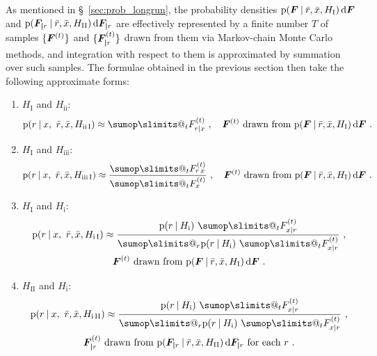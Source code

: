 \documentclass[\ifafour a4paper,12pt,\else a5paper,10pt,\fi%
onecolumn,oneside,article,%
british%
]{memoir}
\makeatletter
\theoremstyle{remark}
\theoremstyle{innote}
\def\sum{\DOTSI\sumop\slimits@}
\newcommand*{\di}{\mathrm{d}}%
\DeclarePairedDelimiter\set{\{}{\}}
\newcommand*{\p}{\mathrm{p}}%
\renewcommand*{\|}[1][]{\nonscript\:#1\vert\nonscript\:\mathopen{}}
\renewcommand*{\=}{\TextOrMath\texteq\eq}
\newcommand*{\sect}{\S}%
\newcommand*{\q}{}%
\DeclareRobustCommand*{\q}{%
  \mathord{\mathpalette\bigcdot@{}}%
}
\newcommand*{\bigcdot@scalefactor}{0.7}
\newcommand*{\bigcdot@widthfactor}{1.5}
\newcommand*{\bigcdot@}[2]{%
  \sbox0{$#1\vcenter{}$}%
  \sbox2{$#1\cdot\m@th$}%
  \hbox to \bigcdot@widthfactor\wd2{%
    \hfil
    \raise\ht0\hbox{%
      \scalebox{\bigcdot@scalefactor}{%
        \lower\ht0\hbox{$#1\bullet\m@th$}%
      }%
    }%
    \hfil
  }%
}
\newcommand*{\ro}{r}
\newcommand*{\xo}{x}
\newcommand*{\rd}{\bar{r}}
\newcommand*{\xd}{\bar{x}}
\newcommand*{\yF}{\bm{F}}
\newcommand*{\yFr}{\yF_{\bm{\mid}r}}
\makeatother
\begin{document}
As mentioned in \sect~\ref{sec:prob_longrun}, the probability densities
$\p(\yF\|\rd,\xd, H_{\textrm{I}})\,\di\yF$ and
$\p(\yFr\|\rd,\xd, H_{\textrm{II}})\,\di\yFr$ are effectively represented
by a finite number $T$ of samples $\set{\yF^{(t)}}$ and $\set{\yFr^{(t)}}$
drawn from them via Markov-chain Monte Carlo methods, and integration with
respect to them is approximated by summation over such samples. The
formulae obtained in the previous section then take the following
approximate forms:
\begin{enumerate}[wide,label=\arabic*'.]
\item\label{item:approx_I_ii} $H_{\textrm{I}}$ and $H_{\textrm{ii}}$:
  \begin{equation}
    \label{eq:approx_post_rx_simple}
    \p(\ro \| \xo,\ \rd,\xd, H_{\textrm{ii\,I}}) 
    \approx  \sum_{t} F^{(t)}_{\ro\mid\xo} \ ,\quad
    \yF^{(t)}\text{ drawn from }\p(\yF\|\rd,\xd, H_{\textrm{I}})\,\di\yF \ .
\end{equation}
  
\item\label{item:approx_I_iii} $H_{\textrm{I}}$ and $H_{\textrm{iii}}$:
  \begin{equation}
    \label{eq:approx_post_rx_updated}
        \p(\ro \| \xo,\ \rd,\xd, H_{\textrm{iii\,I}}) \approx
        \frac{\sum_{t} F^{(t)}_{\ro\,\xo}}{
          \sum_{t} F^{(t)}_{\q\xo} } \ ,\quad
    \yF^{(t)}\text{ drawn from }\p(\yF\|\rd,\xd, H_{\textrm{I}})\,\di\yF \ .
  \end{equation}

\item\label{item:approx_I_i} $H_{\textrm{I}}$ and $H_{\textrm{i}}$:
  \begin{multline}
    \label{eq:approx_post_xr_unfactorized}
    \p(\ro \| \xo,\ \rd,\xd, H_{\textrm{i\,I}}) \approx \frac{
    \p(\ro\|  H_{\textrm{i}})\ \sum_{t} F^{(t)}_{\xo\mid\ro}
  }{ \sum_{r}\p(r\|  H_{\textrm{i}})\ \sum_{t} F^{(t)}_{\xo\mid r} } \ ,\\
    \yF^{(t)}\text{ drawn from }\p(\yF\|\rd,\xd, H_{\textrm{I}})\,\di\yF \ .
\end{multline}
  
\item\label{item:approx_II_i} $H_{\textrm{II}}$ and $H_{\textrm{i}}$:
  \begin{multline}
    \label{eq:approx_post_xr_factorized}
    \p(\ro \| \xo,\ \rd,\xd, H_{\textrm{i\,II}}) \approx \frac{
    \p(\ro\|  H_{\textrm{i}})\ \sum_{t} F^{(t)}_{\xo\mid\ro}
  }{ \sum_{r}\p(r\|  H_{\textrm{i}})\ \sum_{t} F^{(t)}_{\xo\mid r}} \ ,\\
    \yFr^{(t)}\text{ drawn from }\p(\yFr\|\rd,\xd,
    H_{\textrm{II}})\,\di\yFr \text{ for each $r$} \ .
\end{multline}
\end{enumerate}
\end{document}

